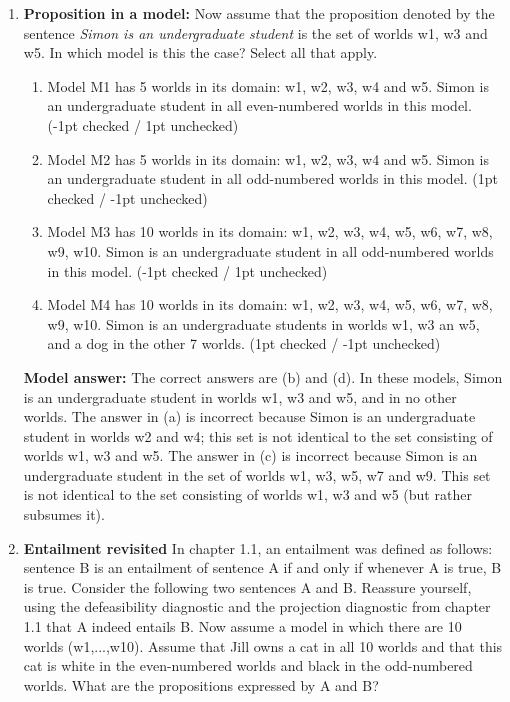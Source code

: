 \documentclass[a4,11pt]{article}
\begin{document}
\begin{enumerate}[leftmargin = 12pt]
  
      \item {\bf Proposition in a model:}  Now assume that the proposition denoted by the sentence  \textit{Simon is an undergraduate student} is the set of worlds w1, w3 and w5. In which model is this the case? Select all that apply. 
            
       \begin{enumerate}[noitemsep]
       \item Model M1 has 5 worlds in its domain: w1, w2, w3, w4 and w5. Simon is an undergraduate student in all even-numbered worlds in this model. (-1pt checked / 1pt unchecked)
       \item Model M2 has 5 worlds in its domain: w1, w2, w3, w4 and w5. Simon is an undergraduate student in all odd-numbered worlds in this model. (1pt checked / -1pt unchecked)
       \item Model M3 has 10 worlds in its domain: w1, w2, w3, w4, w5, w6, w7, w8, w9, w10. Simon is an undergraduate student in all odd-numbered worlds in this model. (-1pt checked / 1pt unchecked) 
       \item Model M4 has 10 worlds in its domain: w1, w2, w3, w4, w5, w6, w7, w8, w9, w10. Simon is an undergraduate students in worlds w1, w3 an w5, and a dog in the other 7 worlds. (1pt checked / -1pt unchecked)
    \end{enumerate}     
  
 {\bf Model answer:} The correct answers are (b) and (d). In these models, Simon is an undergraduate student in worlds w1, w3 and w5, and in no other worlds. The answer in (a) is incorrect because Simon is an undergraduate student in worlds w2 and w4; this set is not identical to the set consisting of worlds w1, w3 and w5. The answer in (c) is incorrect because Simon is an undergraduate student in the set of worlds w1, w3, w5, w7 and w9. This set is not identical to the set consisting of worlds w1, w3 and w5 (but rather subsumes it). 
         
\item {\bf Entailment revisited} In chapter 1.1, an entailment was defined as follows: sentence B is an entailment of sentence A if and only if whenever A is true, B is true. Consider the following two sentences A and B. Reassure yourself, using the defeasibility diagnostic and the projection diagnostic from chapter 1.1 that A indeed entails B.  Now assume a model in which there are 10 worlds (w1,...,w10). Assume that Jill owns a cat in all 10 worlds and that this cat is white in the even-numbered worlds and black in the odd-numbered worlds. What are the propositions expressed by A and B?


\end{enumerate}
\end{document}

